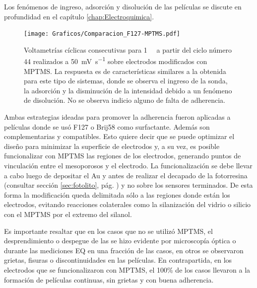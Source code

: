              Los fenómenos de ingreso, adsorción y disolución de las películas se discute en profundidad en el capítulo \ref{chap:Electroquimica}.
       	
					\begin{figure}[!ht]
							\begin{center}
				 	   	    \texttt{[image: Graficos/Comparacion\_F127-MPTMS.pdf]}
				       		\caption[Comparación de superficies con y sin MPTMS.]{Voltametrías cíclicas consecutivas para \aminorutenio\space \SI{1}{\milli\Molar} a partir del ciclo número 44 realizados a \SI{50}{\milli\volt.\second^{-1}} sobre electrodos modificados con MPTMS. La respuesta es de características similares a la obtenida para este tipo de sistemas, donde se observa el ingreso de la sonda, la adsorción y la disminución de la intensidad debido a un fenómeno de disolución. No se observa indicio alguno de falta de adherencia.}
						 \label{fig:comparaciones_MPTMS-B}	
					    \end{center}
					    \end{figure}
		
			 Ambas estrategias ideadas para promover la adherencia fueron aplicadas a películas donde se usó F127 o Brij58\index{Brij58} como surfactante. Además son complementarias y compatibles. Esto quiere decir que se puede optimizar el diseño para minimizar la superficie de electrodos y, a su vez, es posible funcionalizar con MPTMS las regiones de los electrodos, generando puntos de vinculación entre el mesoporosos y el electrodo. La funcionalización se debe llevar a cabo luego de depositar el Au y antes de realizar el decapado de la fotorresina (consultar sección \ref{sec:fotolito}, pág. \pageref{sec:fotolito}) y no sobre los sensores terminados. De esta forma la modificación queda delimitada sólo a las regiones donde están los electrodos, evitando reacciones colaterales como la silanización del vidrio o silicio con el MPTMS por el extremo del silanol.

			 Es importante resaltar que en los casos que no se utilizó MPTMS, el desprendimiento o despegue de las \pdm\space se hizo evidente por microscopía óptica o durante las mediciones EQ en una fracción de las casos, en otros se observaron grietas, fisuras o discontinuidades en las películas. En contrapartida, en los electrodos que se funcionalizaron con MPTMS, el 100\% de los casos llevaron a la formación de películas continuas, sin grietas y con buena adherencia.

